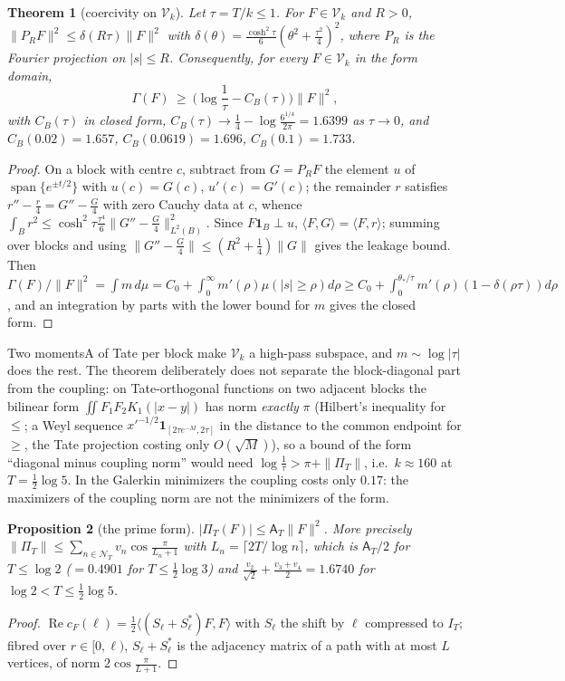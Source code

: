 \documentclass[11pt]{amsart}
\newtheorem{theorem}{Theorem}[section]
\newtheorem{proposition}[theorem]{Proposition}
\theoremstyle{definition}
\theoremstyle{remark}
\newcommand{\Rel}{\operatorname{Re}}
\newcommand{\IT}{I_T}
\newcommand{\cF}{c_F}
\newcommand{\NT}{\mathcal N_T}
\newcommand{\Aconst}{\mathsf A_T}
\newcommand{\PiT}{\Pi_T}
\begin{document}
\begin{theorem}[coercivity on $\mathcal V_k$]\label{thm:B}
Let $\tau=T/k\le1$. For $F\in\mathcal V_k$ and $R>0$, $\|P_RF\|^2\le\delta(R\tau)\|F\|^2$ with
$\delta(\theta)=\frac{\cosh^2\tau}6(\theta^2+\frac{\tau^2}4)^2$, where $P_R$ is the Fourier projection on $|s|\le R$.
Consequently, for every $F\in\mathcal V_k$ in the form domain,
\[
\Gamma(F)\ \ge\ \Big(\log\frac1\tau-C_B(\tau)\Big)\|F\|^2,
\]
with $C_B(\tau)$ in closed form, $C_B(\tau)\to\frac14-\log\frac{6^{1/4}}{2\pi}=1.6399$ as $\tau\to0$, and
$C_B(0.02)=1.657$, $C_B(0.0619)=1.696$, $C_B(0.1)=1.733$.
\end{theorem}
\begin{proof}
On a block with centre $c$, subtract from $G=P_RF$ the element $u$ of $\operatorname{span}\{e^{\pm t/2}\}$ with $u(c)=G(c)$,
$u'(c)=G'(c)$; the remainder $r$ satisfies $r''-\frac r4=G''-\frac G4$ with zero Cauchy data at $c$, whence
$\int_Br^2\le\cosh^2\tau\frac{\tau^4}6\|G''-\frac G4\|^2_{L^2(B)}$. Since $F\mathbf 1_B\perp u$, $\langle F,G\rangle=\langle F,r\rangle$;
summing over blocks and using $\|G''-\frac G4\|\le(R^2+\frac14)\|G\|$ gives the leakage bound. Then
$\Gamma(F)/\|F\|^2=\int m\,d\mu=C_0+\int_0^\infty m'(\rho)\mu(|s|\ge\rho)d\rho\ge C_0+\int_0^{\theta_*/\tau}m'(\rho)(1-\delta(\rho\tau))d\rho$,
and an integration by parts with the lower bound for $m$ gives the closed form.
\end{proof}
Two momentsA of Tate per block make $\mathcal V_k$ a high-pass subspace, and $m\sim\log|\tau|$ does the rest. The theorem
deliberately does not separate the block-diagonal part from the coupling: on Tate-orthogonal functions on two adjacent
blocks the bilinear form $\iint F_1F_2K_1(|x-y|)$ has norm \emph{exactly} $\pi$ (Hilbert's inequality for $\le$; a Weyl sequence
$x'^{-1/2}\mathbf 1_{[2\tau e^{-M},2\tau]}$ in the distance to the common endpoint for $\ge$, the Tate projection costing only
$O(\sqrt M)$), so a bound of the form ``diagonal minus coupling norm'' would need $\log\frac1\tau>\pi+\|\PiT\|$, i.e.\ $k\approx160$
at $T=\frac12\log5$. In the Galerkin minimizers the coupling costs only $0.17$: the maximizers of the coupling norm are not
the minimizers of the form.

\begin{proposition}[the prime form]\label{prop:prime}
$|\PiT(F)|\le\Aconst\|F\|^2$. More precisely $\|\PiT\|\le\sum_{n\in\NT}v_n\cos\frac\pi{L_n+1}$ with $L_n=\lceil2T/\log n\rceil$,
which is $\Aconst/2$ for $T\le\log2$ ($=0.4901$ for $T\le\frac12\log3$) and $\frac{v_2}{\sqrt2}+\frac{v_3+v_4}2=1.6740$ for
$\log2<T\le\frac12\log5$.
\end{proposition}
\begin{proof}
$\Rel\cF(\ell)=\frac12\langle(S_\ell+S_\ell^*)F,F\rangle$ with $S_\ell$ the shift by $\ell$ compressed to $\IT$; fibred over
$r\in[0,\ell)$, $S_\ell+S_\ell^*$ is the adjacency matrix of a path with at most $L$ vertices, of norm $2\cos\frac\pi{L+1}$.
\end{proof}
\end{document}
